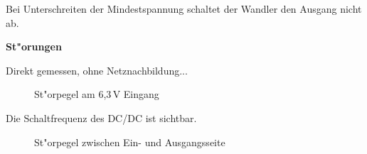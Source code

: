 \documentclass[ngerman,11pt,parskip=half] {scrartcl}
\newcommand {\tscopesize}{12cm}
\begin{document}
Bei Unterschreiten der Mindestspannung schaltet der Wandler den Ausgang nicht ab.

\textbf{St"orungen}

Direkt gemessen, ohne Netznachbildung...

\begin{figure}[H]
\centering
{}
\caption{St"orpegel am 6,3\,V Eingang} \label{fig:1}
\end{figure}

Die Schaltfrequenz des DC/DC ist sichtbar.

\begin{figure}[H]
\centering
{}
\caption{St"orpegel zwischen Ein- und Ausgangsseite} \label{fig:1}
\end{figure}
\end{document}
